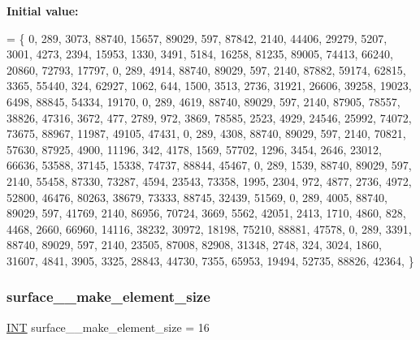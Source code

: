 {\bfseries Initial value\+:}
\begin{DoxyCode}
= \{ 
    0, 289, 3073, 88740, 15657, 89029, 597, 87842, 2140, 44406, 29279, 5207, 3001, 4273, 2394, 15953, 1330,
       3491, 5184, 16258, 81235, 89005, 74413, 66240, 20860, 72793, 17797, 
    0, 289, 4914, 88740, 89029, 597, 2140, 87882, 59174, 62815, 3365, 55440, 324, 62927, 1062, 644, 1500, 
      3513, 2736, 31921, 26606, 39258, 19023, 6498, 88845, 54334, 19170, 
    0, 289, 4619, 88740, 89029, 597, 2140, 87905, 78557, 38826, 47316, 3672, 477, 2789, 972, 3869, 78585, 
      2523, 4929, 24546, 25992, 74072, 73675, 88967, 11987, 49105, 47431, 
    0, 289, 4308, 88740, 89029, 597, 2140, 70821, 57630, 87925, 4900, 11196, 342, 4178, 1569, 57702, 1296, 
      3454, 2646, 23012, 66636, 53588, 37145, 15338, 74737, 88844, 45467, 
    0, 289, 1539, 88740, 89029, 597, 2140, 55458, 87330, 73287, 4594, 23543, 73358, 1995, 2304, 972, 4877, 
      2736, 4972, 52800, 46476, 80263, 38679, 73333, 88745, 32439, 51569, 
    0, 289, 4005, 88740, 89029, 597, 41769, 2140, 86956, 70724, 3669, 5562, 42051, 2413, 1710, 4860, 828, 
      4468, 2660, 66960, 14116, 38232, 30972, 18198, 75210, 88881, 47578, 
    0, 289, 3391, 88740, 89029, 597, 2140, 23505, 87008, 82908, 31348, 2748, 324, 3024, 1860, 31607, 4841, 
      3905, 3325, 28843, 44730, 7355, 65953, 19494, 52735, 88826, 42364, 
\}
\end{DoxyCode}
\mbox{\label{surface__17_8_c_afca98fcd3a0340b12d98fcd6a7f6152e}} 
\subsubsection{\texorpdfstring{surface\+\_\+\_\+make\+\_\+element\+\_\+size}{surface\_17\_make\_element\_size}}
{\footnotesize\ttfamily \mbox{\hyperlink{galois_8h_a09fddde158a3a20bd2dcadb609de11dc}{I\+NT}} surface\+\_\+\_\+make\+\_\+element\+\_\+size = 16}

\mbox{\label{surface__17_8_c_ac5621c3688771126cecbd0b62106dbb9}} 
